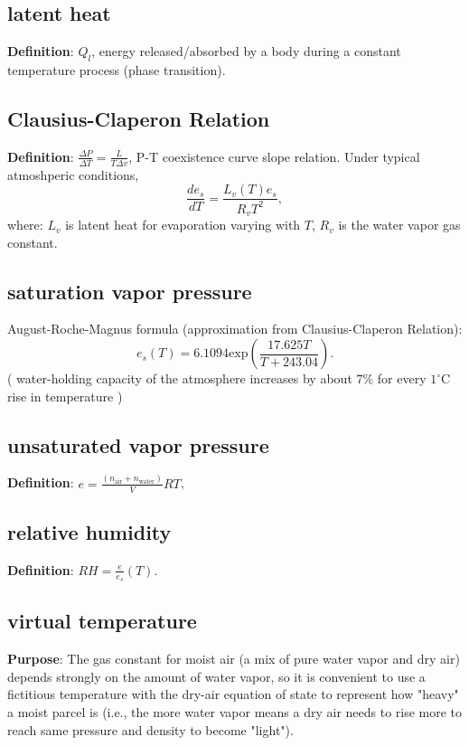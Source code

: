 \subsection{latent heat}
{\bf Definition}: $Q_l$, energy released/absorbed by a body during a constant temperature process
(phase transition).


\subsection{Clausius-Claperon Relation}
{\bf Definition}: $\frac{\Delta P}{\Delta T} = \frac{L}{T\Delta v}$, P-T coexistence curve slope
relation. Under typical atmoshperic conditions, 
\begin{equation}
   \frac{d e_s}{dT} = \frac{L_v(T)e_s}{R_vT^2}, 
\end{equation}
where: $L_v$ is latent heat for evaporation varying with $T$, $R_v$ is the water vapor gas constant.
\\


\subsection{saturation vapor pressure}
\noindent August-Roche-Magnus formula (approximation from Clausius-Claperon Relation): \\
\begin{equation}
   e_s(T) = 6.1094 \text{exp}(\frac{17.625T}{T+243.04}).
\end{equation}
( water-holding capacity of the atmosphere increases by about $7\%$ for every $1^{\circ}$C rise in
temperature )

\subsection{unsaturated vapor pressure}
{\bf Definition}: $e = \frac{(n_{\text{air}} + n_{\text{water}})}{V}RT$, 

\subsection{relative humidity}
{\bf Definition}: $RH = \frac{e}{e_s}(T)$.

\subsection{virtual temperature}
{\bf Purpose}:
The gas constant for moist air (a mix of pure water vapor and dry air) depends strongly on the
amount of water vapor, so it is convenient to use a fictitious temperature with the dry-air equation
of state to represent how "heavy" a moist parcel is (i.e., the more water vapor means a dry air
needs to rise more to reach same pressure and density to become "light"). \\

